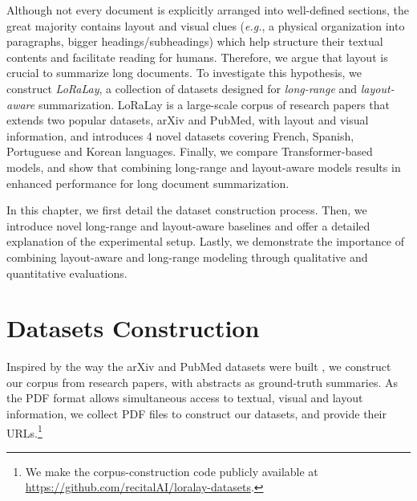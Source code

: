Although not every document is explicitly arranged into well-defined sections, the great majority contains layout and visual clues (\textit{e.g.}, a physical organization into paragraphs, bigger headings/subheadings) which help structure their textual contents and facilitate reading for humans. Therefore, we argue that layout is crucial to summarize long documents. To investigate this hypothesis, we construct \emph{LoRaLay}, a collection of datasets designed for \textit{long-range} and \textit{layout-aware} summarization. LoRaLay is a large-scale corpus of research papers that extends two popular datasets, arXiv and PubMed, with layout and visual information, and introduces 4 novel datasets covering French, Spanish, Portuguese and Korean languages. Finally, we compare Transformer-based models, and show that combining long-range and layout-aware models results in enhanced performance for long document summarization.

In this chapter, we first detail the dataset construction process. Then, we introduce novel long-range and layout-aware baselines and offer a detailed explanation of the experimental setup. Lastly, we demonstrate the importance of combining layout-aware and long-range modeling through qualitative and quantitative evaluations.

\section{Datasets Construction}

Inspired by the way the arXiv and PubMed datasets were built \citep{cohan2018discourse}, we construct our corpus from research papers, with abstracts as ground-truth summaries. As the PDF format allows simultaneous access to textual, visual and layout information, we collect PDF files to construct our datasets, and provide their URLs.\footnote{We make the corpus-construction code publicly available at \url{https://github.com/recitalAI/loralay-datasets}.}


